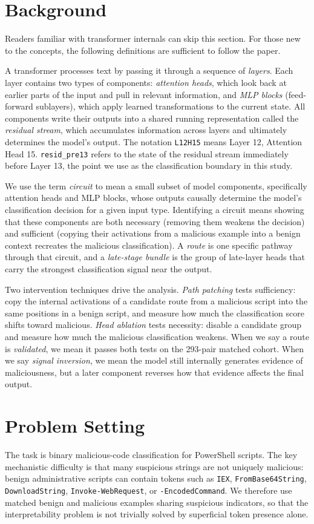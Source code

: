 \documentclass{article}
\begin{document}
\section{Background}
Readers familiar with transformer internals can skip this section. For those new to the concepts, the following definitions are sufficient to follow the paper.

A transformer processes text by passing it through a sequence of \emph{layers}. Each layer contains two types of components: \emph{attention heads}, which look back at earlier parts of the input and pull in relevant information, and \emph{MLP blocks} (feed-forward sublayers), which apply learned transformations to the current state. All components write their outputs into a shared running representation called the \emph{residual stream}, which accumulates information across layers and ultimately determines the model's output. The notation \texttt{L12H15} means Layer 12, Attention Head 15. \texttt{resid\_pre13} refers to the state of the residual stream immediately before Layer 13, the point we use as the classification boundary in this study.

We use the term \emph{circuit} to mean a small subset of model components, specifically attention heads and MLP blocks, whose outputs causally determine the model's classification decision for a given input type. Identifying a circuit means showing that these components are both necessary (removing them weakens the decision) and sufficient (copying their activations from a malicious example into a benign context recreates the malicious classification). A \emph{route} is one specific pathway through that circuit, and a \emph{late-stage bundle} is the group of late-layer heads that carry the strongest classification signal near the output.

Two intervention techniques drive the analysis. \emph{Path patching} tests sufficiency: copy the internal activations of a candidate route from a malicious script into the same positions in a benign script, and measure how much the classification score shifts toward malicious. \emph{Head ablation} tests necessity: disable a candidate group and measure how much the malicious classification weakens. When we say a route is \emph{validated}, we mean it passes both tests on the 293-pair matched cohort. When we say \emph{signal inversion}, we mean the model still internally generates evidence of maliciousness, but a later component reverses how that evidence affects the final output.

\section{Problem Setting}
The task is binary malicious-code classification for PowerShell scripts. The key mechanistic difficulty is that many suspicious strings are not uniquely malicious: benign administrative scripts can contain tokens such as \texttt{IEX}, \texttt{FromBase64String}, \texttt{DownloadString}, \texttt{Invoke-WebRequest}, or \texttt{-EncodedCommand}. We therefore use matched benign and malicious examples sharing suspicious indicators, so that the interpretability problem is not trivially solved by superficial token presence alone.
\end{document}
